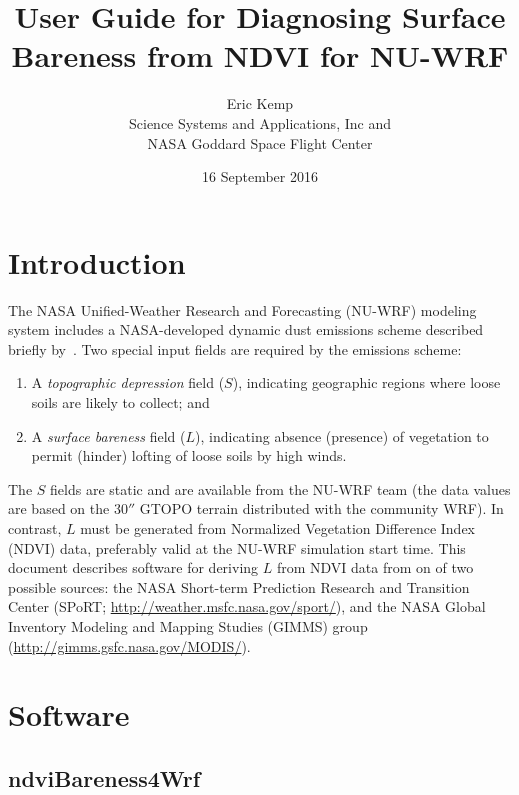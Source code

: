 \documentclass{article}
\begin{document}

\title{User Guide for Diagnosing Surface Bareness from NDVI for NU-WRF}
\author{Eric Kemp \\ Science Systems and Applications, Inc and \\
        NASA Goddard Space Flight Center}
\date{16 September 2016}

\maketitle

\section{Introduction}
\label{sec:Introduction}

The NASA Unified-Weather Research and Forecasting (NU-WRF) modeling system
\citep{ref:PetersLidardEtAl2014} includes a NASA-developed dynamic dust 
emissions scheme described briefly by~\cite{ref:ErodUserGuide}.  Two special
input fields are required by the emissions scheme:

\begin{enumerate}
\item A \emph{topographic depression} field ($S$), indicating geographic
regions where loose soils are likely to collect; and 
\item A \emph{surface bareness} field ($L$), indicating absence (presence)
of vegetation to permit (hinder) lofting of loose soils by high winds.
\end{enumerate}

The $S$ fields are static and are available from the NU-WRF team (the data
values are based on the 30$''$ GTOPO terrain distributed with the community 
WRF). In contrast, $L$ must be generated from Normalized Vegetation Difference
Index (NDVI) data, preferably valid at the NU-WRF simulation start time.  This 
document describes software for deriving $L$ from NDVI data from on of two 
possible sources:  the NASA Short-term Prediction Research and Transition 
Center (SPoRT; \url{http://weather.msfc.nasa.gov/sport/}), and the NASA Global 
Inventory Modeling and Mapping Studies (GIMMS) group
(\url{http://gimms.gsfc.nasa.gov/MODIS/}).

\section{Software}
\label{sec:Software}

\subsection{ndviBareness4Wrf}
\label{subsec:ndviBareness4Wrf}
\end{document}
